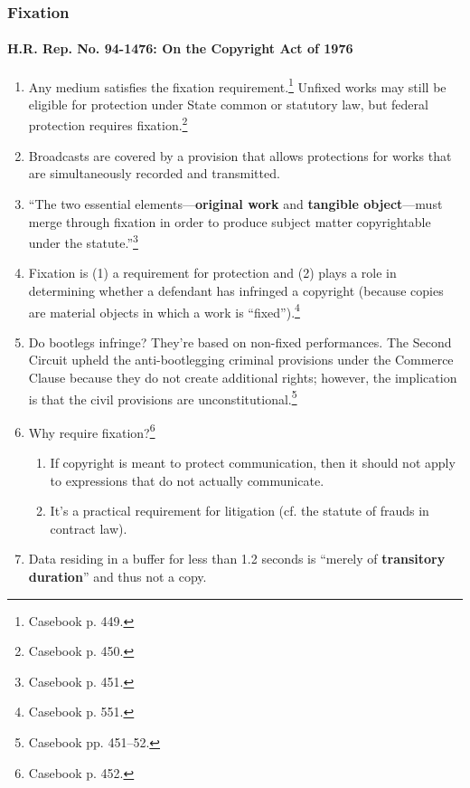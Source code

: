 \subsubsection{Fixation}

\paragraph{H.R. Rep. No. 94-1476: On the Copyright Act of 1976}

\begin{enumerate}
    \item Any medium satisfies the fixation requirement.\footnote{Casebook p. 
    449.} Unfixed works may still be eligible for protection under State 
    common or statutory law, but federal protection requires 
    fixation.\footnote{Casebook p. 450.}
    \item Broadcasts are covered by a provision that allows protections for 
    works that are simultaneously recorded and transmitted.
    \item ``The two essential elements---\textbf{original work} and 
    \textbf{tangible object}---must merge through fixation in order to produce 
    subject matter copyrightable under the statute.''\footnote{Casebook p. 
    451.}
    \item Fixation is (1) a requirement for protection and (2) plays a role in 
    determining whether a defendant has infringed a copyright (because copies 
    are material objects in which a work is ``fixed'').\footnote{Casebook p. 
    551.}
    \item Do bootlegs infringe? They're based on non-fixed performances. The 
    Second Circuit upheld the anti-bootlegging criminal provisions under the 
    Commerce Clause because they do not create additional rights; however, the 
    implication is that the civil provisions are 
    unconstitutional.\footnote{Casebook pp. 451--52.}
    \item Why require fixation?\footnote{Casebook p. 452.}
    \begin{enumerate}
        \item If copyright is meant to protect communication, then it should 
        not apply to expressions that do not actually communicate.
        \item It's a practical requirement for litigation (cf. the statute of 
        frauds in contract law).
    \end{enumerate}
    \item Data residing in a buffer for less than 1.2 seconds is ``merely of 
    \textbf{transitory duration}'' and thus not a copy.
\end{enumerate}

